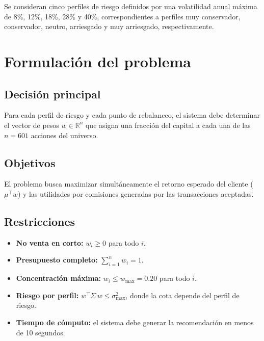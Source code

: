 Se consideran cinco perfiles de riesgo definidos por una volatilidad anual máxima de 8\%, 12\%, 18\%, 28\% y 40\%, correspondientes a perfiles muy conservador, conservador, neutro, arriesgado y muy arriesgado, respectivamente.

\section{Formulaci\'on del problema}

\subsection{Decisi\'on principal}

Para cada perfil de riesgo y cada punto de rebalanceo, el sistema debe
determinar el vector de pesos $w \in \mathbb{R}^n$ que asigna una fracci\'on
del capital a cada una de las $n = 601$ acciones del universo.

\subsection{Objetivos}

El problema busca maximizar simultáneamente el retorno esperado del cliente ($\mu^\top w$) y las utilidades por comisiones generadas por las transacciones aceptadas.
    
\subsection{Restricciones}
\begin{itemize}
    \item \textbf{No venta en corto:} $w_i \geq 0$ para todo $i$.
    \item\textbf{Presupuesto completo:} $\sum_{i=1}^{n} w_i = 1$.
    \item\textbf{Concentraci\'on m\'axima:} $w_i \leq w_{\max} = 0.20$ para todo $i$.
    \item\textbf{Riesgo por perfil:} $w^\top \Sigma\, w \leq \sigma_{\max}^2$, donde la cota depende del perfil de riesgo.
    \item\textbf{Tiempo de c\'omputo:} el sistema debe generar la recomendaci\'on en menos de 10 segundos.
\end{itemize}


